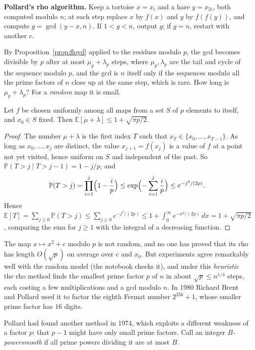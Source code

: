 \noindent\textbf{Pollard's rho algorithm.} Keep a tortoise $x=x_i$ and a hare $y=x_{2i}$, both computed modulo $n$; at each step replace $x$ by $f(x)$ and $y$ by $f(f(y))$, and compute $g=\gcd(y-x,n)$. If $1<g<n$, output $g$; if $g=n$, restart with another $c$.

By Proposition~\ref{prop:floyd} applied to the residues modulo $p$, the gcd becomes divisible by $p$ after at most $\mu_p+\lambda_p$ steps, where $\mu_p,\lambda_p$ are the tail and cycle of the sequence modulo $p$, and the gcd is $n$ itself only if the sequences modulo all the prime factors of $n$ close up at the same step, which is rare. How long is $\mu_p+\lambda_p$? For a \emph{random} map it is small.

\begin{proposition}\label{prop:birthday}
Let $f$ be chosen uniformly among all maps from a set $S$ of $p$ elements to itself, and $x_0\in S$ fixed. Then $\mathbb E[\mu+\lambda]\le1+\sqrt{\pi p/2}$.
\end{proposition}
\begin{proof}
The number $\mu+\lambda$ is the first index $T$ such that $x_T\in\{x_0,\dots,x_{T-1}\}$. As long as $x_0,\dots,x_j$ are distinct, the value $x_{j+1}=f(x_j)$ is a value of $f$ at a point not yet visited, hence uniform on $S$ and independent of the past. So $\mathbb P(T>j\mid T>j-1)=1-j/p$, and
\[
\mathbb P(T>j)=\prod_{i=1}^j\Bigl(1-\frac ip\Bigr)\le\exp\Bigl(-\sum_{i=1}^j\frac ip\Bigr)\le e^{-j^2/(2p)}.
\]
Hence $\mathbb E[T]=\sum_{j\ge0}\mathbb P(T>j)\le\sum_{j\ge0}e^{-j^2/(2p)}\le1+\int_0^\infty e^{-x^2/(2p)}\,dx=1+\sqrt{\pi p/2}$, comparing the sum for $j\ge1$ with the integral of a decreasing function.
\end{proof}

The map $x\mapsto x^2+c$ modulo $p$ is not random, and no one has proved that its rho has length $O(\sqrt p)$ on average over $c$ and $x_0$. But experiments agree remarkably well with the random model (the notebook checks it), and under this \emph{heuristic} the rho method finds the smallest prime factor $p$ of $n$ in about $\sqrt p\le n^{1/4}$ steps, each costing a few multiplications and a gcd modulo $n$. In 1980 Richard Brent and Pollard used it to factor the eighth Fermat number $2^{256}+1$, whose smaller prime factor has $16$ digits.

Pollard had found another method in 1974, which exploits a different weakness of a factor $p$: that $p-1$ might have only small prime factors. Call an integer \emph{$B$-powersmooth} if all prime powers dividing it are at most $B$.

